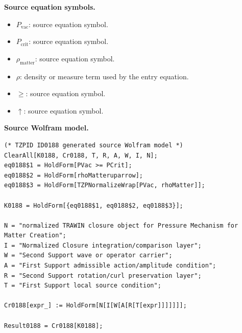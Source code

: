 \begin{minipage}[t]{0.49\linewidth}
\begingroup
\small
\raggedright
\textbf{Source equation symbols.}\par
\begin{itemize}[leftmargin=1.35em,itemsep=1pt,topsep=1pt,parsep=0pt]
    \item $P_{\mathrm{vac}}$: source equation symbol.
    \item $P_{\mathrm{crit}}$: source equation symbol.
    \item $\rho_{\mathrm{matter}}$: source equation symbol.
    \item $\rho$: density or measure term used by the entry equation.
    \item $\ge$: source equation symbol.
    \item $\uparrow$: source equation symbol.
\end{itemize}
\endgroup
\end{minipage}\hfill
\begin{minipage}[t]{0.47\linewidth}
\begingroup
\scriptsize
\raggedright
\textbf{Source Wolfram model.}\par
\begin{Verbatim}[fontsize=\tiny,breaklines=true,breakanywhere=true]
(* TZPID ID0188 generated source Wolfram model *)
ClearAll[K0188, Cr0188, T, R, A, W, I, N];
eq0188$1 = HoldForm[PVac >= PCrit];
eq0188$2 = HoldForm[rhoMatteruparrow];
eq0188$3 = HoldForm[TZPNormalizeWrap[PVac, rhoMatter]];

K0188 = HoldForm[{eq0188$1, eq0188$2, eq0188$3}];

N = "normalized TRAWIN closure object for Pressure Mechanism for Matter Creation";
I = "Normalized Closure integration/comparison layer";
W = "Second Support wave or operator carrier";
A = "First Support admissible action/amplitude condition";
R = "Second Support rotation/curl preservation layer";
T = "First Support local source condition";

Cr0188[expr_] := HoldForm[N[I[W[A[R[T[expr]]]]]]];

Result0188 = Cr0188[K0188];
\end{Verbatim}
\endgroup
\end{minipage}

